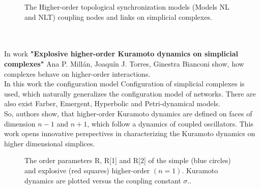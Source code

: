 \documentclass[draft]{article}
\newcommand\tab[1][1cm]{\hspace*{#1}}
\begin{document}
\begin{figure}[h]
\caption{The Higher-order topological synchronization models (Models NL and NLT) coupling nodes and links on simplicial complexes\cite{litlink6}.}
\label{ris:image}
\end{figure}\\
~\\
\tab In work \textbf{"Explosive higher-order Kuramoto dynamics on simplicial complexes"} Ana P. Millán, Joaquín J. Torres, Ginestra Bianconi show, how complexes behave on higher-order interactions.\\
\tab In this work the configuration model Configuration of simplicial complexes is used, which naturally generalizes the configuration model of networks. There are also exist Farber, Emergent, Hyperbolic and Petri-dynamical models.\\
\tab So, authors show, that higher-order Kuramoto dynamics are defined on faces of dimension $n-1$ and $n+1$, which follow a dynamics of coupled oscillators. This work opens innovative perspectives in characterizing the Kuramoto dynamics on higher dimensional simplices.\\
\begin{figure}[h]
\caption{The order parameters R, R[1] and R[2] of the simple (blue circles) and explosive (red squares) higher-order $(n = 1)$. Kuramoto dynamics are plotted versus the coupling constant $\sigma$.\cite{litlink7}.}
\label{ris:image}
\end{figure}\\
\end{document}
